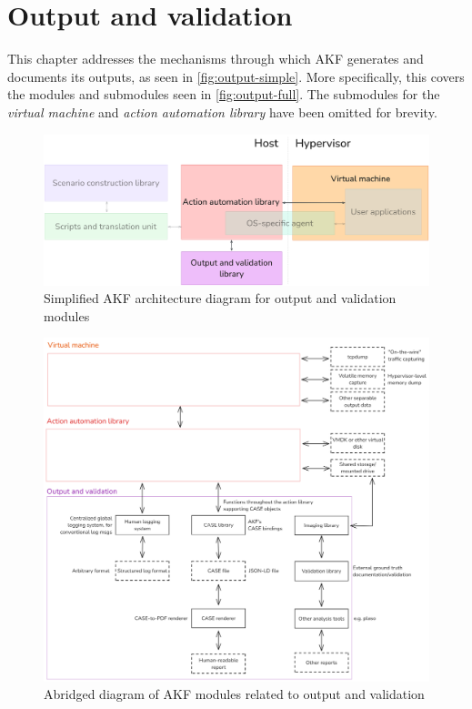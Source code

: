 \documentclass[letterpaper,12pt]{report}
\begin{document}
\chapter{Output and validation}\label{chapter-five}

\hfill\break

This chapter addresses the mechanisms through which AKF generates and
documents its outputs, as seen in \autoref{fig:output-simple}. More
specifically, this covers the modules and submodules seen in
\autoref{fig:output-full}. The submodules for the \emph{virtual machine}
and \emph{action automation library} have been omitted for brevity.

\begin{figure}[h]
\centering
\includegraphics[width=1\linewidth]{output-and-validation-simple.png}
\caption{Simplified AKF architecture diagram for output and validation
modules}\label{fig:output-simple}
\end{figure}

\begin{figure}[h]
\centering
\includegraphics[width=1\linewidth]{output-and-validation-full.png}
\caption{Abridged diagram of AKF modules related to output and
validation}\label{fig:output-full}
\end{figure}
\end{document}
